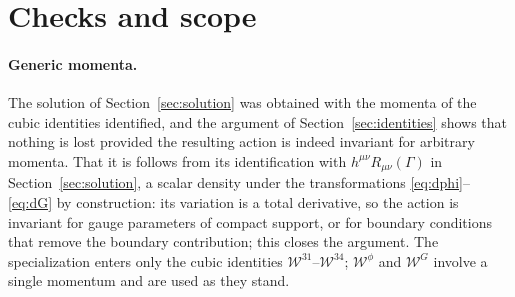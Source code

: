 \documentclass[prd,aps,preprint,superscriptaddress,nofootinbib,amsmath,amssymb,eqsecnum]{revtex4-2}
\newcommand{\W}{\mathcal{W}}
\begin{document}
\section{Checks and scope}
\label{sec:checks}

\paragraph{Generic momenta.} The solution of Section~\ref{sec:solution} was obtained with
the momenta of the cubic identities identified, and the argument of
Section~\ref{sec:identities} shows that nothing is lost provided the resulting action is
indeed invariant for arbitrary momenta. That it is follows from its identification with
$h^{\mu\nu}R_{\mu\nu}(\Gamma)$ in Section~\ref{sec:solution}, a scalar density under the
transformations \eqref{eq:dphi}--\eqref{eq:dG} by construction: its variation is a total
derivative, so the action is invariant for gauge parameters of compact support, or for
boundary conditions that remove the boundary contribution; this closes the argument. The
specialization enters only the cubic identities $\W^{31}$--$\W^{34}$; $\W^{\phi}$ and
$\W^{G}$ involve a single momentum and are used as they stand.
\end{document}

